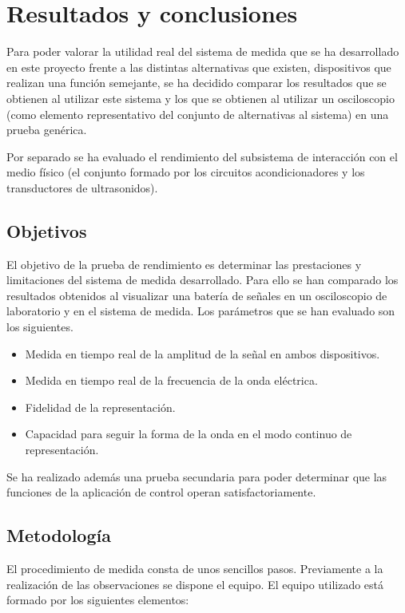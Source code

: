 \chapter{Resultados y conclusiones}\label{chap:part1conclusions}

Para poder valorar la utilidad real del sistema de medida que se ha
desarrollado en este proyecto frente a las distintas alternativas que
existen, dispositivos que realizan una función semejante, se ha decidido
comparar los resultados que se obtienen al utilizar este sistema y los que
se obtienen al utilizar un osciloscopio (como elemento representativo del
conjunto de alternativas al sistema) en una prueba genérica.

Por separado se ha evaluado el rendimiento del subsistema de interacción
con el medio físico (el conjunto formado por los circuitos acondicionadores
y los transductores de ultrasonidos).


\section{Objetivos}

El objetivo de la prueba de rendimiento es determinar las prestaciones y
limitaciones del sistema de medida desarrollado. Para ello se han comparado
los resultados obtenidos al visualizar una batería de señales en un
osciloscopio de laboratorio y en el sistema de medida. Los parámetros que
se han evaluado son los siguientes.

\begin{itemize}
    \item Medida en tiempo real de la amplitud de la señal en ambos
	dispositivos.
    \item Medida en tiempo real de la frecuencia de la onda eléctrica.
    \item Fidelidad de la representación.
    \item Capacidad para seguir la forma de la onda en el modo continuo de
	representación.
\end{itemize}

Se ha realizado además una prueba secundaria para poder determinar que las
funciones de la aplicación de control operan satisfactoriamente.


\section{Metodología}\label{sec:working-test}

El procedimiento de medida consta de unos sencillos pasos. Previamente a la
realización de las observaciones se dispone el equipo. El equipo utilizado
está formado por los siguientes elementos:

